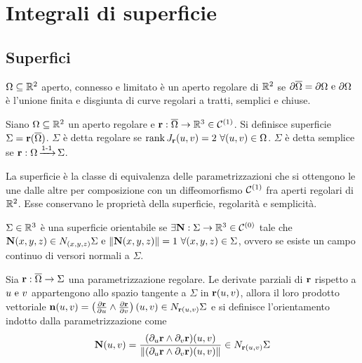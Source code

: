 \chapter{Integrali di superficie}

\section{Superfici}

\begin{definition}
	$\Omega \subseteq \mathbb{R}^2$ aperto, connesso e limitato è un aperto regolare di $\mathbb{R}^2$ se $\partial \overline{\Omega}=\partial \Omega \text{ e } \partial \Omega$ è l'unione finita e disgiunta di curve regolari a tratti, semplici e chiuse.
\end{definition}

\begin{definition}
	[Superficie]
	Siano $\Omega \subseteq \mathbb{R}^2$ un aperto regolare e $\vb{r}:\overline{\Omega}\to \mathbb{R}^3 \in \mathcal{C}^{(1)}$. Si definisce superficie $\Sigma=\vb{r}(\overline{\Omega})$.
	$\Sigma$ è detta regolare se $\rank{J_{\vb{r}}(u,v)} = 2 \ \forall (u,v) \in \Omega$.
	$\Sigma$ è detta semplice se $\vb{r}:\Omega \operatorname{\xrightarrow{\operatorname{1-1}}} \Sigma$.
\end{definition}

\begin{remark}
	La superficie è la classe di equivalenza delle parametrizzazioni che si ottengono le une dalle altre per composizione con un diffeomorfismo $\mathcal{C}^{(1)}$ fra aperti regolari di $\mathbb{R}^2$. Esse conservano le proprietà della superficie, regolarità e semplicità.
\end{remark}

\begin{definition}
	$\Sigma \in \mathbb{R}^3$ è una superficie orientabile se $\exists \vb{N}:\Sigma \to \mathbb{R}^3 \in \mathcal{C}^{(0)}$ tale che $\vb{N}(x,y,z)\in N_{(x,y,z)}\Sigma \text{ e } \norm{\vb{N}(x,y,z)}=1 \ \forall (x,y,z) \in \Sigma$, ovvero se esiste un campo continuo di versori normali a $\Sigma$.
\end{definition}

Sia $\vb{r}:\overline{\Omega} \to \Sigma$ una parametrizzazione regolare. Le derivate parziali di $\vb{r}$ rispetto a $u \text{ e } v$ appartengono allo spazio tangente a $\Sigma$ in $\vb{r}(u,v)$, allora il loro prodotto vettoriale $\vb{n}(u,v)=\left(\frac{\partial \vb{r}}{\partial u}\wedge\frac{\partial \vb{r}}{\partial v}\right)(u,v) \in N_{\vb{r}(u,v)}\Sigma$ e si definisce l'orientamento indotto dalla parametrizzazione come
$$
	\vb{N}(u,v)=\frac{(\partial_u\vb{r}\wedge\partial_v\vb{r})(u,v)}{\norm{(\partial_u\vb{r}\wedge\partial_v\vb{r})(u,v)}}\in N_{\vb{r}(u,v)}\Sigma
$$

